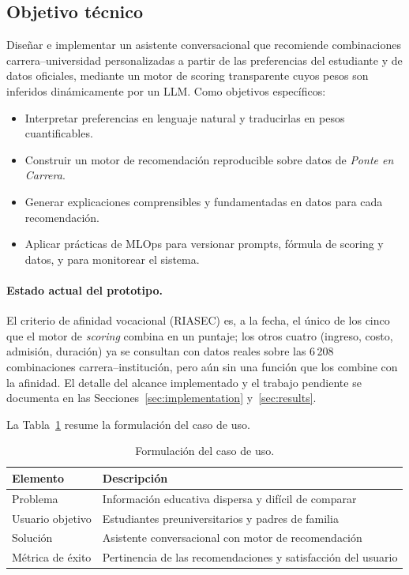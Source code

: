 \subsection{Objetivo t\'ecnico}

Dise\~nar e implementar un asistente conversacional que recomiende combinaciones
carrera--universidad personalizadas a partir de las preferencias del estudiante y
de datos oficiales, mediante un motor de scoring transparente cuyos pesos son
inferidos din\'amicamente por un LLM. Como objetivos espec\'ificos:

\begin{itemize}[noitemsep]
  \item Interpretar preferencias en lenguaje natural y traducirlas en pesos
        cuantificables.
  \item Construir un motor de recomendaci\'on reproducible sobre datos de
        \emph{Ponte en Carrera}.
  \item Generar explicaciones comprensibles y fundamentadas en datos para cada
        recomendaci\'on.
  \item Aplicar pr\'acticas de MLOps para versionar prompts, f\'ormula de scoring
        y datos, y para monitorear el sistema.
\end{itemize}

\paragraph{Estado actual del prototipo.} El criterio de afinidad vocacional
(RIASEC) es, a la fecha, el \'unico de los cinco que el motor de
\emph{scoring} combina en un puntaje; los otros cuatro (ingreso, costo,
admisi\'on, duraci\'on) ya se consultan con datos reales sobre las 6\,208
combinaciones carrera--instituci\'on, pero a\'un sin una funci\'on que los
combine con la afinidad. El detalle del alcance implementado y el trabajo
pendiente se documenta en las Secciones~\ref{sec:implementation}
y~\ref{sec:results}.

La Tabla~\ref{tab:use-case} resume la formulaci\'on del caso de uso.

\begin{table}[H]
\centering
\begin{tabular}{@{}ll@{}}
\toprule
\textbf{Elemento} & \textbf{Descripci\'on} \\
\midrule
Problema         & Informaci\'on educativa dispersa y dif\'icil de comparar \\
Usuario objetivo & Estudiantes preuniversitarios y padres de familia \\
Soluci\'on       & Asistente conversacional con motor de recomendaci\'on \\
M\'etrica de \'exito & Pertinencia de las recomendaciones y satisfacci\'on del usuario \\
\bottomrule
\end{tabular}
\caption{Formulaci\'on del caso de uso.}
\label{tab:use-case}
\end{table}

